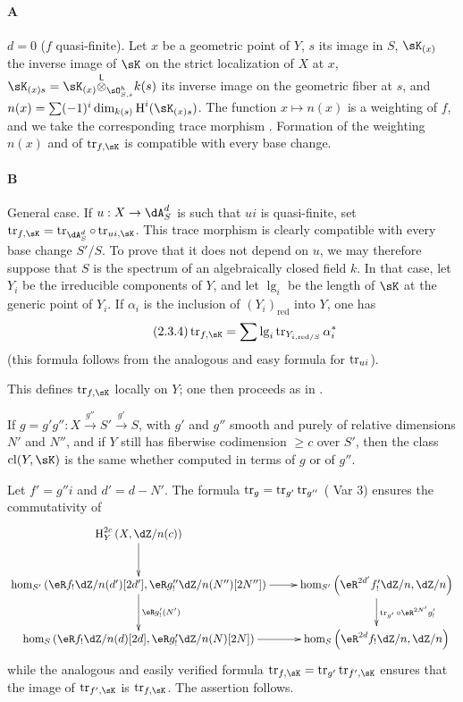 \paragraph{A}
$d=0$ ($f$ quasi-finite). Let $x$ be a geometric point of $Y$, $s$ its image
in $S$, $\sK_{(x)}$ the inverse image of $\sK$ on the strict localization of
$X$ at $x$, $\sK_{(x)s} = \sK_{(x)}\lotimes_{\sO_{S,s}^h} k(s)$ its inverse
image on the geometric fiber at $s$, and
$n(x)=\sum (-1)^i \dim_{k(s)} \h^i(\sK_{(x)s})$. The function
$x\mapsto n(x)$ is a weighting of $f$, and we take the corresponding trace
morphism \cite[XVII.6.2.5]{sga4}. Formation of the weighting $n(x)$ and of
$\tr_{f,\sK}$ is compatible with every base change.

\paragraph{B}
General case. If $u:X\to \dA_S^d$ is such that $u i$ is quasi-finite, set
$\tr_{f,\sK} = \tr_{\dA_S^d}\circ \tr_{u i,\sK}$. This trace morphism is
clearly compatible with every base change $S'/S$. To prove that it does not
depend on $u$, we may therefore suppose that $S$ is the spectrum of an
algebraically closed field $k$. In that case, let $Y_i$ be the irreducible
components of $Y$, and let $\operatorname{lg}_i$ be the length of $\sK$ at
the generic point of $Y_i$. If $\alpha_i$ is the inclusion of
$(Y_i)_\text{red}$ into $Y$, one has
\begin{equation*}\tag{2.3.4}\label{IV:eq:2-3-4}
  \tr_{f,\sK} = \sum \operatorname{lg}_i \tr_{Y_{i,\text{red}/S}} \alpha_i^\ast
\end{equation*}
(this formula follows from the analogous and easy formula for $\operatorname{tr}_{u i}$).

This defines $\tr_{f,\sK}$ locally on $Y$; one then proceeds as in
\cite[XVIII.2.9]{sga4}.






\begin{lemma}\label{IV:2-3-5}
If $g=g'g'':X\xrightarrow{g''} S'\xrightarrow{g'} S$, with $g'$ and $g''$
smooth and purely of relative dimensions $N'$ and $N''$, and if $Y$ still
has fiberwise codimension $\geqslant c$ over $S'$, then the class
$\operatorname{cl}(Y,\sK)$ is the same whether computed in terms of $g$ or
of $g''$.
\end{lemma}

Let $f'=g'' i$ and $d'=d-N'$. The formula
$\operatorname{tr}_g=\operatorname{tr}_{g'}\operatorname{tr}_{g''}$ (\cite[XVIII.2.9]{sga4} Var 3) ensures the
commutativity of
\[\xymatrix{
  \h_Y^{2 c}\left(X,\dZ/n(c)\right) \ar[d] \\
  \hom_{S'}\left(\eR f_!\dZ/n(d')[2 d'],\eR g_!''\dZ/n(N'')[2 N'']\right) \ar[r] \ar[d]^-{\eR g_!'(N')}
    & \hom_{S'}\left(\eR^{2 d'} f_!' \dZ/n,\dZ/n\right) \ar[d]^-{\tr_{g'}\circ \eR^{2 N'} g_!'} \\
  \hom_S\left(\eR f_!\dZ/n(d)[2d],\eR g_!'\dZ/n(N)[2 N]\right) \ar[r]
    & \hom_S\left(\eR^{2 d} f_!\dZ/n,\dZ/n\right)
}\]
while the analogous and easily verified formula
$\tr_{f,\sK}=\tr_{g'}\tr_{f',\sK}$ ensures that the image of
$\tr_{f',\sK}$ is $\tr_{f,\sK}$. The assertion follows.






